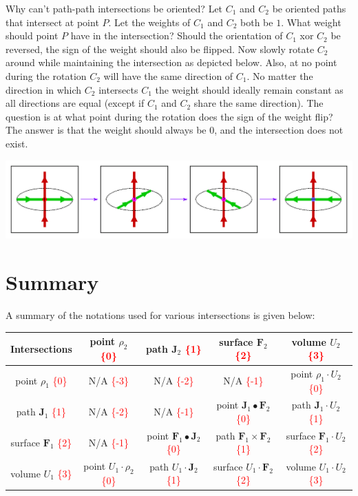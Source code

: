\documentclass{book}
\newcommand{\red}[1]{\textcolor{red}{#1}}
\begin{document}
Why can't path-path intersections be oriented? Let \(C_1\) and \(C_2\) be oriented paths that intersect at point \(P\). Let the weights of \(C_1\) and \(C_2\) both be \(1\). What weight should point \(P\) have in the intersection? Should the orientation of \(C_1\) xor \(C_2\) be reversed, the sign of the weight should also be flipped. Now slowly rotate \(C_2\) around while maintaining the intersection as depicted below. Also, at no point during the rotation \(C_2\) will have the same direction of \(C_1\). No matter the direction in which \(C_2\) intersects \(C_1\) the weight should ideally remain constant as all directions are equal (except if \(C_1\) and \(C_2\) share the same direction). The question is at what point during the rotation does the sign of the weight flip? The answer is that the weight should always be \(0\), and the intersection does not exist.  

\begin{center}
\includegraphics[width = \textwidth]{Intersections/Undefined_intersections/path_path_intersection_contradiction_2}
\end{center}



\section{Summary}

A summary of the notations used for various intersections is given below:

\vspace{5mm}

\begin{tabular}{|c||c|c|c|c|}
\hline
Intersections & point \(\rho_2\) \red{\{0\}} & path \(\mathbf{J}_2\) \red{\{1\}} & surface \(\mathbf{F}_2\) \red{\{2\}} & volume \(U_2\) \red{\{3\}} \\
\hline
\hline
point \(\rho_1\) \red{\{0\}} & 
N/A \red{\{-3\}} & 
N/A \red{\{-2\}} & 
N/A \red{\{-1\}} & 
point \(\rho_1 \cdot U_2\) \red{\{0\}} \\ 
\hline
path \(\mathbf{J}_1\) \red{\{1\}} & 
N/A \red{\{-2\}} & 
N/A \red{\{-1\}} & 
point \(\mathbf{J}_1 \bullet \mathbf{F}_2\) \red{\{0\}} & 
path \(\mathbf{J}_1 \cdot U_2\) \red{\{1\}} \\ 
\hline
surface \(\mathbf{F}_1\) \red{\{2\}} & 
N/A \red{\{-1\}} & 
point \(\mathbf{F}_1 \bullet \mathbf{J}_2\) \red{\{0\}} & 
path \(\mathbf{F}_1 \times \mathbf{F}_2\) \red{\{1\}} & 
surface \(\mathbf{F}_1 \cdot U_2\) \red{\{2\}} \\ 
\hline
volume \(U_1\) \red{\{3\}} & 
point \(U_1 \cdot \rho_2\) \red{\{0\}} & 
path \(U_1 \cdot \mathbf{J}_2\) \red{\{1\}} & 
surface \(U_1 \cdot \mathbf{F}_2\) \red{\{2\}} & 
volume \(U_1 \cdot U_2\) \red{\{3\}} \\
\hline
\end{tabular}
\end{document}
